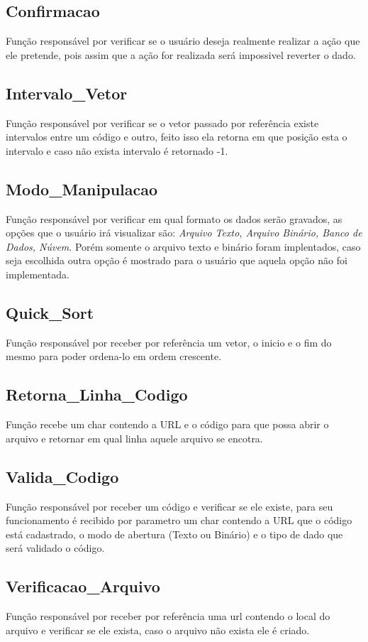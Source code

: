 \documentclass{article}
\begin{document}
\subsection{Confirmacao}
	Função responsável por verificar se o usuário deseja realmente realizar a ação que ele pretende, pois assim que a ação for realizada será impossivel reverter o dado.
\subsection{Intervalo\_Vetor}
	Função responsável por verificar se o vetor passado por referência existe intervalos entre um código e outro, feito isso ela retorna em que posição esta o intervalo e caso não exista intervalo é retornado -1. 
\subsection{Modo\_Manipulacao}
	Função responsável por verificar em qual formato os dados serão gravados, as opções que o usuário irá visualizar são: \textit{Arquivo Texto, Arquivo Binário, Banco de Dados, Núvem}. Porém somente o arquivo texto e binário foram implentados, caso seja escolhida outra opção é mostrado para o usuário que aquela opção não foi implementada.
\subsection{Quick\_Sort}
	Função responsável por receber por referência um vetor, o inicio e o fim do mesmo para poder ordena-lo em ordem crescente. 
\subsection{Retorna\_Linha\_Codigo}
	Função recebe um char contendo a URL e o código para que possa abrir o arquivo e retornar em qual linha aquele arquivo se encotra.
\subsection{Valida\_Codigo}
	Função responsável por receber um código e verificar se ele existe, para seu funcionamento é recibido por parametro um char contendo a URL que o código está cadastrado, o modo de abertura (Texto ou Binário) e o tipo de dado que será validado o código.
\subsection{Verificacao\_Arquivo}
	Função responsável por receber por referência uma url contendo o local do arquivo e verificar se ele exista, caso o arquivo não exista ele é criado.
\end{document}
